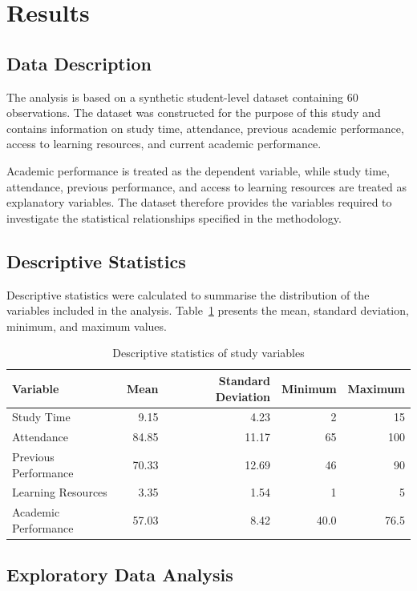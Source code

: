 \section{Results}

\subsection{Data Description}

The analysis is based on a synthetic student-level dataset containing 60 observations. The dataset was constructed for the purpose of this study and contains information on study time, attendance, previous academic performance, access to learning resources, and current academic performance.

Academic performance is treated as the dependent variable, while study time, attendance, previous performance, and access to learning resources are treated as explanatory variables. The dataset therefore provides the variables required to investigate the statistical relationships specified in the methodology.

\subsection{Descriptive Statistics}

Descriptive statistics were calculated to summarise the distribution of the variables included in the analysis. Table~\ref{tab:descriptive} presents the mean, standard deviation, minimum, and maximum values.

\begin{table}[htbp]
\centering
\caption{Descriptive statistics of study variables}
\label{tab:descriptive}
\begin{tabular}{lrrrr}
\toprule
Variable & Mean & Standard Deviation & Minimum & Maximum \\
\midrule
Study Time & 9.15 & 4.23 & 2 & 15 \\
Attendance & 84.85 & 11.17 & 65 & 100 \\
Previous Performance & 70.33 & 12.69 & 46 & 90 \\
Learning Resources & 3.35 & 1.54 & 1 & 5 \\
Academic Performance & 57.03 & 8.42 & 40.0 & 76.5 \\
\bottomrule
\end{tabular}
\end{table}

\subsection{Exploratory Data Analysis}

